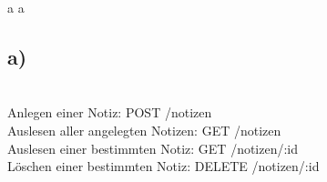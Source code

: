 \documentclass[ngerman]{fbi-aufgabenblatt}
\begin{document}
	a
	a
	\subsection{a)} \\
	Anlegen einer Notiz: POST /notizen \\
	Auslesen aller angelegten Notizen: GET /notizen \\
	Auslesen einer bestimmten Notiz: GET /notizen/:id \\
	Löschen einer bestimmten Notiz: DELETE /notizen/:id
	
	
\end{document}
